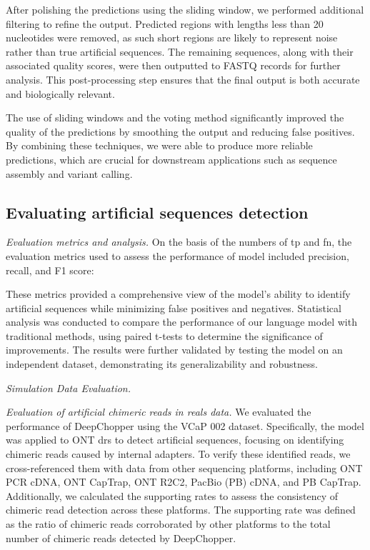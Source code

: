 \documentclass[pdflatex, sn-mathphys-num, lineno]{sn-jnl}%
\theoremstyle{thmstyleone}%
\theoremstyle{thmstyletwo}%
\theoremstyle{thmstylethree}%
\begin{document}
After polishing the predictions using the sliding window, we performed additional filtering to refine the output.
Predicted regions with lengths less than 20 nucleotides were removed, as such short regions are likely to represent noise rather than true artificial sequences.
The remaining sequences, along with their associated quality scores, were then outputted to FASTQ records for further analysis.
This post-processing step ensures that the final output is both accurate and biologically relevant.

The use of sliding windows and the voting method significantly improved the quality of the predictions by smoothing the output and reducing false positives.
By combining these techniques, we were able to produce more reliable predictions, which are crucial for downstream applications such as sequence assembly and variant calling.



\subsection{Evaluating artificial sequences detection}

\textit{Evaluation metrics and analysis.} On the basis of the numbers of \gls{tp} and \gls{fn}, the evaluation metrics used to assess the performance of  model included precision, recall, and F1 score:

These metrics provided a comprehensive view of the model's ability to identify artificial sequences while minimizing false positives and negatives.
Statistical analysis was conducted to compare the performance of our language model with traditional methods, using paired t-tests to determine the significance of improvements.
The results were further validated by testing the model on an independent dataset, demonstrating its generalizability and robustness.


\textit{Simulation Data Evaluation.}


\textit{Evaluation of artificial chimeric reads in reals data.}  We evaluated the performance of DeepChopper using the VCaP 002 dataset.
Specifically, the model was applied to ONT \gls{drs} to detect artificial sequences, focusing on identifying chimeric reads caused by internal adapters.
To verify these identified reads, we cross-referenced them with data from other sequencing platforms, including ONT PCR cDNA, ONT CapTrap, ONT R2C2, PacBio (PB) cDNA, and PB CapTrap. Additionally, we calculated the supporting rates to assess the consistency of chimeric read detection across these platforms.
The supporting rate was defined as the ratio of chimeric reads corroborated by other platforms to the total number of chimeric reads detected by DeepChopper.
\end{document}
